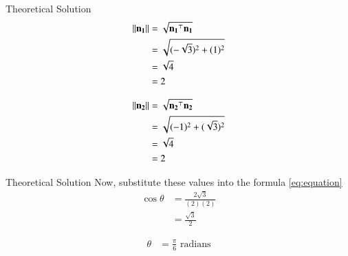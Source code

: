 \documentclass{beamer}
\begin{document}
\begin{frame}{Theoretical Solution}
\begin{align}
\left\lVert\mathbf{n_1}\right\rVert &= \sqrt{\mathbf{n_1}^\top\mathbf{n_1}}\\
&= \sqrt{(-\sqrt{3})^2 + (1)^2} \\
&= \sqrt{4} \\
&= 2
\end{align}

\begin{align}
\left\lVert\mathbf{n_2}\right\rVert &= \sqrt{\mathbf{n_2}^\top\mathbf{n_2}}\\
&= \sqrt{(-1)^2 + (\sqrt{3})^2} \\
&= \sqrt{4} \\
&= 2
\end{align}
\end{frame}

\begin{frame}{Theoretical Solution}
Now, substitute these values into the formula \eqref{eq:equation}
\begin{align}
\cos \theta &= \frac{2\sqrt{3}}{(2)(2)} \\
&= \frac{\sqrt{3}}{2}
\end{align}

\begin{align}
\theta &= \frac{\pi}{6} \text{ radians}
\end{align}
\end{frame}
\end{document}

